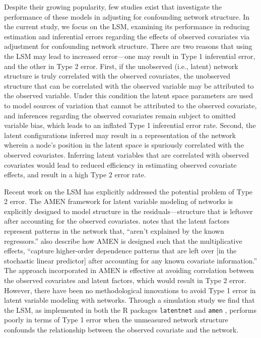 \documentclass[11pt]{article}
\begin{document}
Despite their growing popularity, few studies exist that investigate
the performance of these models in adjusting for confounding network
structure. In the current study, we focus on the LSM, examining its
performance in reducing estimation and inferential errors regarding
the effects of observed covariates via adjustment for confounding
network structure. There are two reasons that using the LSM may lead
to increased error---one may result in Type 1 inferential error, and
the other in Type 2 error. First, if the unobserved (i.e., latent)
network structure is truly correlated with the observed covariates,
the unobserved structure that can be correlated with the observed
variable may be attributed to the observed variable. Under this
condition the latent space parameters are used to model sources of
variation that cannot be attributed to the observed covariate, and
inferences regarding the observed covariates remain subject to omitted
variable bias, which leads to an inflated Type 1 inferential error
rate. Second, the latent configurations inferred may result in a
representation of the network wherein a node's position in the latent
space is spuriously correlated with the observed covariates. Inferring
latent variables that are correlated with observed covariates would
lead to reduced efficiency in estimating observed covariate effects,
and result in a high Type 2 error rate.

Recent work on the LSM has explicitly addressed the potential problem
of Type 2 error. The AMEN framework for latent variable modeling of
networks is explicitly designed to model structure in the
residuals---structure that is leftover after accounting for the
observed covariates. \citet[p. 43]{hoff2015dyadic} notes that the
latent factors represent patterns in the network that, ``aren't
explained by the known regressors.''
\citet[pp. 12--13]{minhas2016inferential} also describe how AMEN is
designed such that the multiplicative effects, ``capture higher-order
dependence patterns that are left over [in the stochastic linear
  predictor] after accounting for any known covariate information.''
The approach incorporated in AMEN is effective at avoiding correlation
between the observed covariates and latent factors, which would result
in Type 2 error. However, there have been no methodological
innovations to avoid Type 1 error in latent variable modeling with
networks. Through a simulation study we find that the LSM, as
implemented in both the R \citep{R} packages \texttt{latentnet}
\citep{latentnet} and \texttt{amen} \citep{amen}, performs poorly in
terms of Type 1 error when the unmeasured network structure confounds
the relationship between the observed covariate and the network.
\end{document}
